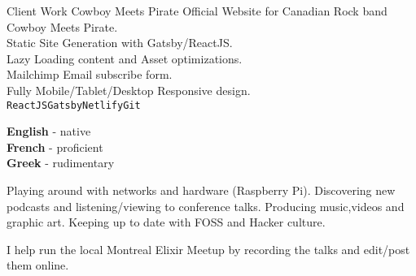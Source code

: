 \documentclass[9pt]{developercv} %
\begin{document}
\begin{entrylist}
	\entry
		{Client Work}
		{Cowboy Meets Pirate}
		{}
		{Official Website for Canadian Rock band Cowboy Meets Pirate.\\
      Static Site Generation with Gatsby/ReactJS.\\
      Lazy Loading content and Asset optimizations.\\
      Mailchimp Email subscribe form.\\
      Fully Mobile/Tablet/Desktop Responsive design.
      \\\texttt{ReactJS}\slashsep\texttt{Gatsby}\slashsep\texttt{Netlify}\slashsep\texttt{Git}}

\end{entrylist}
\begin{minipage}[t]{0.2\textwidth}
	\vspace{-\baselineskip} %

	
	\textbf{English} - native\\
	\textbf{French} - proficient\\
	\textbf{Greek} - rudimentary
\end{minipage}
\hfill
\begin{minipage}[t]{0.4\textwidth}
	\vspace{-\baselineskip} %
	
	
    Playing around with networks and hardware (Raspberry Pi).
  Discovering new podcasts and listening/viewing to conference talks.
  Producing music,videos and graphic art.
  Keeping up to date with FOSS and Hacker culture.
\end{minipage}
\hfill
\begin{minipage}[t]{0.3\textwidth}
	\vspace{-\baselineskip} %
	
	
	I help run the local Montreal Elixir Meetup by recording the talks and edit/post them online.
\end{minipage}

\end{document}
